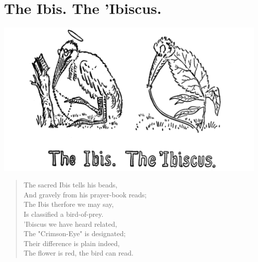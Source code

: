 \documentclass[letterpaper, 10pt, openany]{memoir}
\begin{document}
\chapter{The Ibis. The 'Ibiscus.}
\includegraphics[width=1\textwidth]{f-p21.png}
\vspace{\onelineskip}
\begin{verse}\huge
The sacred Ibis tells his beads,\\
And gravely from his prayer-book reads;\\
The Ibis therfore we may say,\\
Is classified a bird-of-prey.\\
'Ibiscus we have heard related,\\
The "Crimson-Eye" is designated;\\
Their difference is plain indeed,\\
The flower is red, the bird can read.\\
\end{verse}
\end{document}
